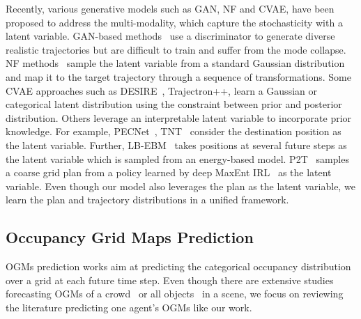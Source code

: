 \documentclass[10pt,twocolumn,letterpaper]{article}
\begin{document}
Recently, various generative models such as GAN, NF and CVAE, have been proposed to address the multi-modality, which capture the stochasticity with a latent variable. GAN-based methods~\cite{gupta2018social,amirian2019social,hu2020collaborative,sadeghian2019sophie,eiffert2020probabilistic} use a discriminator to generate diverse realistic trajectories but are difficult to train and suffer from the mode collapse. NF methods~\cite{rhinehart2018r2p2,park2020diverse} sample the latent variable from a standard Gaussian distribution and map it to the target trajectory through a sequence of transformations. Some CVAE approaches such as DESIRE~\cite{lee2017desire}, Trajectron++\cite{salzmann2020trajectron++}, learn a Gaussian or categorical latent distribution using the constraint between prior and posterior distribution. Others leverage an interpretable latent variable to incorporate prior knowledge. For example, PECNet~\cite{mangalam2020not}, TNT~\cite{zhao2020tnt} consider the destination position as the latent variable. Further, LB-EBM~\cite{pang2021trajectory} takes positions at several future steps as the latent variable which is sampled from an energy-based model. P2T~\cite{deo2020trajectory} samples a coarse grid plan from a policy learned by deep MaxEnt IRL~\cite{wulfmeier2017large} as the latent variable. Even though our model also leverages the plan as the latent variable, we learn the plan and trajectory distributions in a unified framework.

\subsection{Occupancy Grid Maps Prediction}

OGMs prediction works aim at predicting the categorical occupancy distribution over a grid at each future time step. Even though there are extensive studies forecasting OGMs of a crowd~\cite{li2017pedestrian,minoura2020crowd} or all objects~\cite{Mohajerin2019MultiStep,luo2021safety} in a scene, we focus on reviewing the literature predicting one agent's OGMs like our work.  
\end{document}
